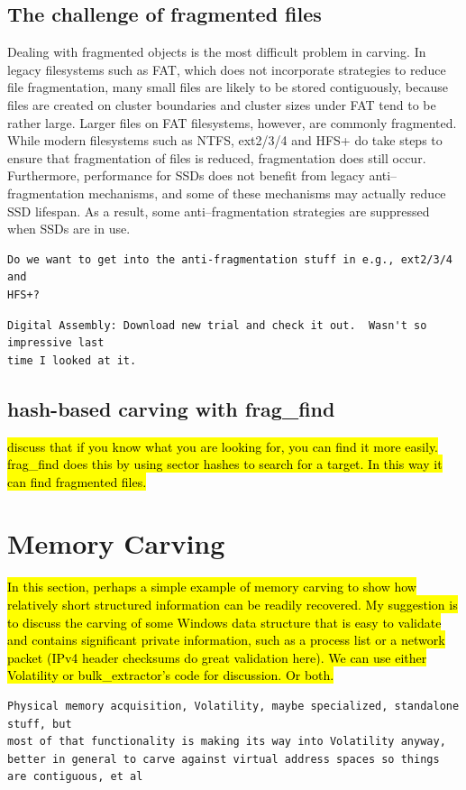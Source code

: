\subsection{The challenge of fragmented files}




Dealing with fragmented objects is the most difficult problem in carving.  In legacy filesystems such as FAT, which does not incorporate strategies to reduce file fragmentation, many small files are likely to be stored contiguously, because files are created on cluster boundaries and cluster sizes under FAT tend to be rather large.  Larger files on FAT filesystems, however, are commonly fragmented\cite{dfrws2007:SimsonLGarfinkel}.  While modern filesystems such as NTFS, ext2/3/4 and HFS+ do take steps to ensure that fragmentation of files is reduced, fragmentation does still occur.  Furthermore, performance for SSDs does not benefit from legacy anti--fragmentation mechanisms, and some of these mechanisms may actually reduce SSD lifespan.  As a result, some anti--fragmentation strategies are suppressed when SSDs are in use.  

\begin{Verbatim}
Do we want to get into the anti-fragmentation stuff in e.g., ext2/3/4 and 
HFS+?
\end{Verbatim}

\begin{Verbatim}
Digital Assembly: Download new trial and check it out.  Wasn't so impressive last
time I looked at it.
\end{Verbatim}

\subsection{hash-based carving with frag\_find}

\hl{discuss that if you know what you are looking for, you can find it
  more easily. frag\_find does this by using sector hashes to search
  for a target. In this way it can find fragmented files.}


\section{Memory Carving}

\hl{In this section, perhaps a simple example of memory carving to
  show how relatively short structured information can be readily
  recovered. My suggestion is to discuss the carving of some Windows
  data structure that is easy to validate and contains significant
  private information, such as a process list or a network packet
  (IPv4 header checksums do great validation here). We can use either
  Volatility or bulk\_extractor's code for discussion. Or both. }

\begin{Verbatim}
Physical memory acquisition, Volatility, maybe specialized, standalone stuff, but
most of that functionality is making its way into Volatility anyway, better in general to carve against virtual address spaces so things are contiguous, et al



\end{Verbatim}
